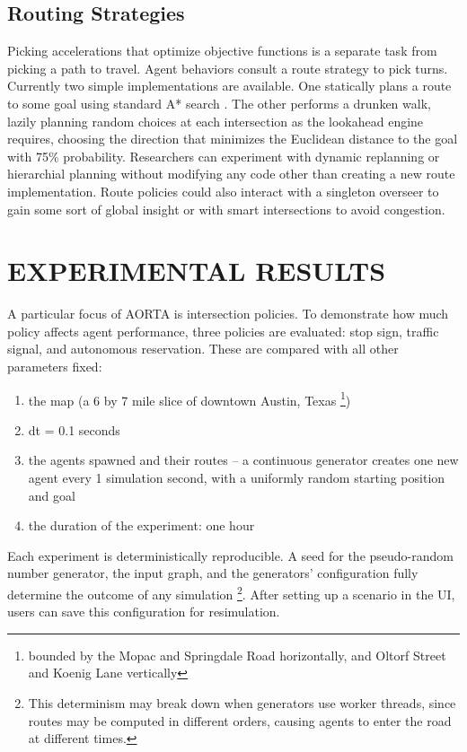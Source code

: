 \documentclass[letterpaper, 10 pt, conference]{ieeeconf}  %
\begin{document}
\subsection{Routing Strategies}

Picking accelerations that optimize objective functions is a separate task from
picking a path to travel. Agent behaviors consult a route strategy to pick
turns. Currently two simple implementations are available. One statically plans
a route to some goal using standard A* search \cite{astar}. The other performs a
drunken walk, lazily planning random choices at each intersection as the
lookahead engine requires, choosing the direction that minimizes the Euclidean
distance to the goal with 75\% probability. Researchers can experiment with
dynamic replanning or hierarchial planning without modifying any code other than
creating a new route implementation. Route policies could also interact with a
singleton overseer to gain some sort of global insight or with smart
intersections to avoid congestion.


\section{EXPERIMENTAL RESULTS}
\label{sec:results}

A particular focus of AORTA is intersection policies. To demonstrate how much
policy affects agent performance, three policies are evaluated: stop sign,
traffic signal, and autonomous reservation. These are compared with all other
parameters fixed:

\begin{enumerate}
  \item the map (a 6 by 7 mile slice of downtown Austin, Texas
        \footnote{bounded by the Mopac and Springdale Road horizontally,
        and Oltorf Street and Koenig Lane vertically})
  \item dt = 0.1 seconds
  \item the agents spawned and their routes -- a continuous generator creates
        one new agent every 1 simulation second, with a uniformly random
        starting position and goal
  \item the duration of the experiment: one hour
\end{enumerate}

Each experiment is deterministically reproducible. A seed for the pseudo-random
number generator, the input graph, and the generators' configuration fully
determine the outcome of any simulation \footnote{This determinism may break
  down when generators use worker threads, since routes may be computed in
different orders, causing agents to enter the road at different times.}. After
setting up a scenario in the UI, users can save this configuration for
resimulation.
\end{document}
